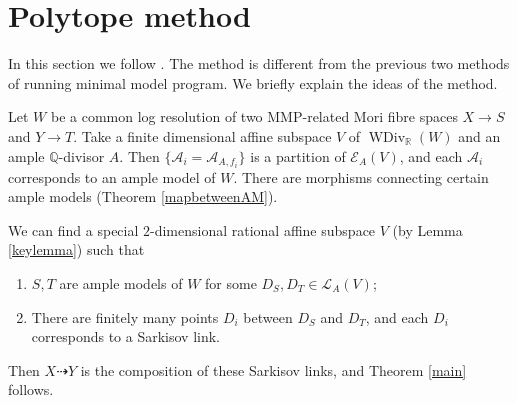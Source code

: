 \documentclass[11pt]{amsart}
\begin{document}
\section{Polytope method}\label{thirdmethod}
In this section we follow \cite{haconSarkisovProgram2012}.
The method is different from the previous two methods of running minimal model program. We briefly explain the ideas of the method.

Let $W$ be a common log resolution of two MMP-related Mori fibre spaces $X\to S$ and $Y\to T$. Take a finite dimensional affine subspace $V$ of $\operatorname{WDiv}_{\mathbb{R}}(W)$ and an ample $\mathbb{Q}$-divisor $A$. Then $\{\mathcal{A}_{i} =\mathcal{A}_{A,f_{i}}\} $ is a partition of $\mathcal{E}_{A}(V)$, and each $\mathcal{A}_{i}$ corresponds to an ample model of $W$.    There are morphisms connecting certain ample models (Theorem \ref{mapbetweenAM}).

We can find a special $2$-dimensional rational affine subspace  $V$ (by Lemma \ref{keylemma}) such that 
\begin{enumerate}
  \item $S,T$ are ample models of $W$ for some $D_{S},D_{T} \in \mathcal{L}_{A}(V)$;
  \item  There are finitely many points  $D_{i}$ between $D_{S}$ and $D_{T}$, and each $D_{i}$ corresponds to a Sarkisov link.
\end{enumerate}

Then  $X\dashrightarrow Y$ is the composition of these Sarkisov links, and  Theorem \ref{main} follows.
\end{document}
